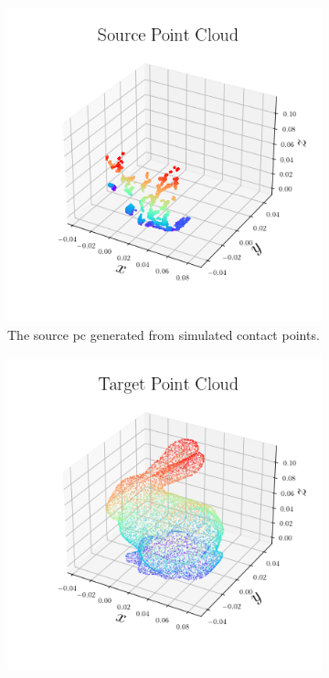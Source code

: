 \begin{figure}[!h]
	\centering
	\begin{subfigure}[b]{0.3\textwidth}
		\centering
		\includegraphics[width=\textwidth]{chapters/1-tactile-perception/fig/matplotlib/pc_source.png}
		\caption{The source \gls{pc} generated from simulated contact points.}
		\label{fig:pc-source}
	\end{subfigure}
	\hfill
	\begin{subfigure}[b]{0.3\textwidth}
		\centering
		\includegraphics[width=\textwidth]{chapters/1-tactile-perception/fig/matplotlib/pc_target.png}

\end{subfigure}
\end{figure}
